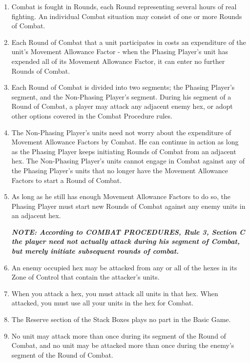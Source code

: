 \begin{enumerate}
  \item Combat is fought in Rounds, each Round representing several hours of real fighting. An individual Combat situation may consist of one or more Rounds of Combat.

  \item Each Round of Combat that a unit participates in costs an expenditure of the unit's Movement Allowance Factor - when the Phasing Player's unit has expended all of its Movement Allowance Factor, it can enter no further Rounds of Combat.

  \item Each Round of Combat is divided into two segments; the Phasing Player's segment, and the Non-Phasing Player's segment. During his segment of a Round of Combat, a player may attack any adjacent enemy hex, or adopt other options covered in the Combat Procedure rules.

  \item The Non-Phasing Player's units need not worry about the expenditure of Movement Allowance Factors by Combat. He can continue in action as long as the Phasing Player keeps initiating Rounds of Combat from an adjacent hex. The Non-Phasing Player's units cannot engage in Combat against any of the Phasing Player's units that no longer have the Movement Allowance Factors to start a Round of Combat.

  \item As long as he still has enough Movement Allowance Factors to do so, the Phasing Player must start new Rounds of Combat against any enemy units in an adjacent hex.

  \textbf{\textit{NOTE: According to COMBAT PROCEDURES, Rule 3, Section C the player need not actually attack during his segment of Combat, but merely initiate subsequent rounds of combat.}}

  \item An enemy occupied hex may be attacked from any or all of the hexes in its Zone of Control that contain the attacker's units.

  \item When you attack a hex, you must attack all units in that hex. When attacked, you must use all your units in the hex for Combat.

  \item The Reserve section of the Stack Boxes plays no part in the Basic Game.

  \item No unit may attack more than once during its segment of the Round of Combat, and no unit may be attacked more than once during the enemy's segment of the Round of Combat.


\end{enumerate}
